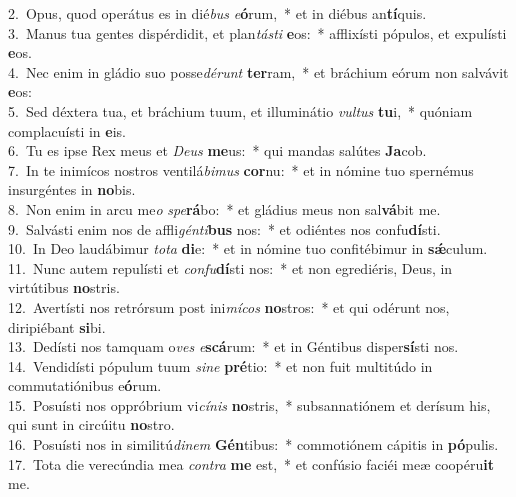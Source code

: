 {2.~}Opus, quod operátus es in dié\textit{bus} \textit{e}\textbf{ó}rum,~* et in diébus an\textbf{tí}quis.\\
{3.~}Manus tua gentes dispérdidit, et plan\textit{tá}\textit{sti} \textbf{e}os:~* afflixísti pópulos, et expulísti \textbf{e}os.\\
{4.~}Nec enim in gládio suo posse\textit{dé}\textit{runt} \textbf{ter}ram,~* et bráchium eórum non salvávit \textbf{e}os:\\
{5.~}Sed déxtera tua, et bráchium tuum, et illuminátio \textit{vul}\textit{tus} \textbf{tu}i,~* quóniam complacuísti in \textbf{e}is.\\
{6.~}Tu es ipse Rex meus et \textit{De}\textit{us} \textbf{me}us:~* qui mandas salútes \textbf{Ja}cob.\\
{7.~}In te inimícos nostros ventilá\textit{bi}\textit{mus} \textbf{cor}nu:~* et in nómine tuo spernémus insurgéntes in \textbf{no}bis.\\
{8.~}Non enim in arcu me\textit{o} \textit{spe}\textbf{rá}bo:~* et gládius meus non sal\textbf{vá}bit me.\\
{9.~}Salvásti enim nos de affli\textit{gén}\textit{ti}\textbf{bus} nos:~* et odiéntes nos confu\textbf{dí}sti.\\
{10.~}In Deo laudábimur \textit{to}\textit{ta} \textbf{di}e:~* et in nómine tuo confitébimur in \textbf{sǽ}culum.\\
{11.~}Nunc autem repulísti et \textit{con}\textit{fu}\textbf{dí}sti nos:~* et non egrediéris, Deus, in virtútibus \textbf{no}stris.\\
{12.~}Avertísti nos retrórsum post ini\textit{mí}\textit{cos} \textbf{no}stros:~* et qui odérunt nos, diripiébant \textbf{si}bi.\\
{13.~}Dedísti nos tamquam o\textit{ves} \textit{e}\textbf{scá}rum:~* et in Géntibus disper\textbf{sí}sti nos.\\
{14.~}Vendidísti pópulum tuum \textit{si}\textit{ne} \textbf{pré}tio:~* et non fuit multitúdo in commutatiónibus e\textbf{ó}rum.\\
{15.~}Posuísti nos oppróbrium vi\textit{cí}\textit{nis} \textbf{no}stris,~* subsannatiónem et derísum his, qui sunt in circúitu \textbf{no}stro.\\
{16.~}Posuísti nos in similitú\textit{di}\textit{nem} \textbf{Gén}tibus:~* commotiónem cápitis in \textbf{pó}pulis.\\
{17.~}Tota die verecúndia mea \textit{con}\textit{tra} \textbf{me} est,~* et confúsio faciéi meæ coopéru\textbf{it} me.\\
